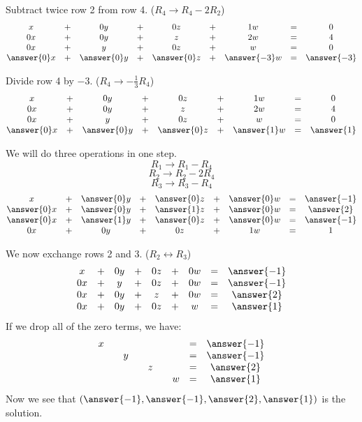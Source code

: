 \documentclass{ximera}
\begin{document}
\begin{example}
\begin{prompt} Subtract twice row 2 from row 4. ($R_4\rightarrow R_4-2R_2$)
$$\begin{matrix}
      x &+ &0y&+&0z&+&1w&= &0 \\
     0x& +&0y&+&z&+&2w&=&4\\
     0x& +&y&+&0z&+&w&=&0\\
     \answer{0}x&+&\answer{0}y&+& \answer{0}z&+& \answer{-3}w&=& \answer{-3}
    \end{matrix}$$
\end{prompt}

\begin{prompt} Divide row 4 by $-3$. ($R_4\rightarrow -\frac{1}{3}R_4$)
$$\begin{matrix}
      x &+ &0y&+&0z&+&1w&= &0 \\
     0x& +&0y&+&z&+&2w&=&4\\
     0x& +&y&+&0z&+&w&=&0\\
     \answer{0}x&+&\answer{0}y&+&\answer{0}z&+& \answer{1}w&=&\answer{1}
    \end{matrix}$$
\end{prompt}   

\begin{prompt} We will do three operations in one step.
$$R_1\rightarrow R_1-R_4$$
$$R_2\rightarrow R_2-2R_4$$
$$R_3\rightarrow R_3-R_4$$
$$\begin{matrix}
      x &+ &\answer{0}y&+&\answer{0}z&+& \answer{0}w&= & \answer{-1} \\
     \answer{0}x& +&\answer{0}y&+&\answer{1}z&+& \answer{0}w&=& \answer{2}\\
     \answer{0}x& +&\answer{1}y&+&\answer{0}z&+& \answer{0}w&=& \answer{-1}\\
     0x&+&0y&+&0z&+&1w&=&1
    \end{matrix}$$
\end{prompt}   

We now exchange rows 2 and 3. ($R_2\leftrightarrow R_3$)
\begin{equation}\label{eq:sys20rref1}
\begin{array}{ccccccccc}
      x &+ &0y&+&0z&+&0w&= &\answer{-1} \\
   0x& +&y&+&0z&+&0w&=&\answer{-1}\\
   0x& +&0y&+&z&+&0w&=&\answer{2}\\
     0x&+&0y&+&0z&+&w&=&\answer{1}
    \end{array}
    \end{equation}
    If we drop all of the zero terms, we have:
    \begin{equation}\label{eq:sys20rrefnozeros}
    \begin{array}{ccccccccc}
      x & &&&&&&= &\answer{-1} \\
   & &y&&&&&=&\answer{-1}\\
   & &&&z&&&=&\answer{2}\\
     &&&&&&w&=&\answer{1}
    \end{array}
    \end{equation}
Now we see that $(\answer{-1}, \answer{-1}, \answer{2}, \answer{1})$ is the solution.
\end{example}
 
\end{document}
